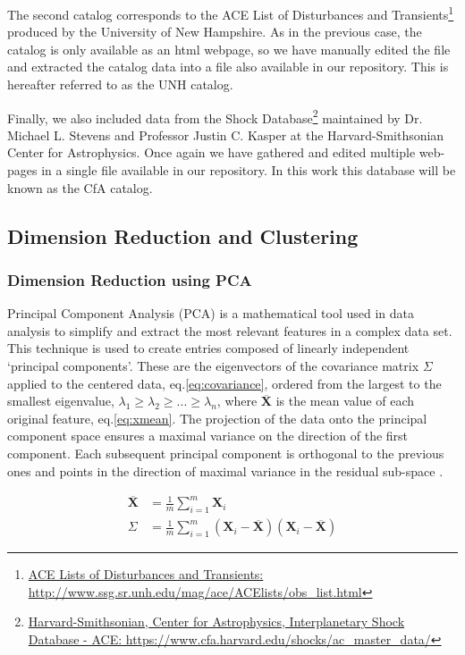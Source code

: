 \documentclass[utf8]{frontiersSCNS} %
\begin{document}
The second catalog corresponds to the ACE List of Disturbances and Transients\footnote{\href{http://www.ssg.sr.unh.edu/mag/ace/ACElists/obs\_list.html}{ACE Lists of Disturbances and Transients: http://www.ssg.sr.unh.edu/mag/ace/ACElists/obs\_list.html}} produced by the University of New Hampshire. As in the previous case, the catalog is only available as an html webpage, so we have manually edited the file and extracted the catalog data into a file also available in our repository. This is hereafter referred to as the UNH catalog.

Finally, we also included data from the Shock Database\footnote{\href{https://www.cfa.harvard.edu/shocks/ac_master_data/}{Harvard-Smithsonian, Center for Astrophysics, Interplanetary Shock Database - ACE: https://www.cfa.harvard.edu/shocks/ac\_master\_data/}} maintained by Dr. Michael L. Stevens and Professor Justin C. Kasper at the Harvard-Smithsonian Center for Astrophysics. Once again we have gathered and edited multiple web-pages in a single file available in our repository. In this work this database will be known as the CfA catalog.

\subsection{Dimension Reduction and Clustering}
\subsubsection{Dimension Reduction using PCA}
\label{sec:reducpca}
Principal Component Analysis (PCA) is a mathematical tool used in data analysis to simplify and extract the most relevant features in a complex data set. This technique is used to create entries composed of linearly independent `principal components'. These are the eigenvectors of the covariance matrix $\Sigma$ applied to the centered data, eq.\eqref{eq:covariance}, ordered from the largest to the smallest eigenvalue, $\lambda_1 \ge \lambda_2 \ge ... \ge \lambda_n$, where $\overline{\boldsymbol{X}}$ is the mean value of each original feature, eq.\eqref{eq:xmean}. The projection of the data onto the principal component space ensures a maximal variance on the direction of the first component. Each subsequent principal component is orthogonal to the previous ones and points in the direction of maximal variance in the residual sub-space \citep{Shlens2014}.

\begin{align}
\overline{\boldsymbol{X}} & = \frac{1}{m} \sum_{i=1}^{m} \boldsymbol{X}_i \label{eq:xmean} \\
\Sigma & = \frac{1}{m} \sum_{i=1}^{m} \left( \boldsymbol{X}_i - \overline{\boldsymbol{X}} \right)\left( \boldsymbol{X}_i - \overline{\boldsymbol{X}} \right) \label{eq:covariance}
\end{align}
\end{document}
